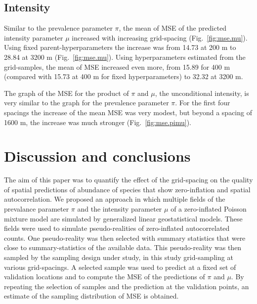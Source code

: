 \documentclass[review]{elsarticle}
\begin{document}
\subsection{Intensity}
Similar to the prevalence parameter $\pi$, the  mean of MSE of the predicted intensity parameter $\mu$ increased with increasing grid-spacing (Fig.~\ref{fig:mse.mu}). Using fixed parent-hyperparameters the increase was from 14.73 at 200 m to 28.84 at 3200 m (Fig.~\ref{fig:mse.mu}). Using hyperparameters estimated from the grid-samples, the mean of MSE increased even more, from 15.89 for 400 m (compared with 15.73 at 400 m for fixed hyperparameters) to 32.32 at 3200 m.  

The  graph of the MSE for the product of $\pi$ and $\mu$, the unconditional intensity, is very similar to the graph for the prevalence parameter $\pi$. For the first four spacings the increase of the mean MSE was very modest, but beyond a spacing of 1600 m, the increase was much stronger (Fig.~\ref{fig:mse.pimu}).  

\section{Discussion and conclusions}\label{sec:discussion}
The aim of this paper was to quantify the effect of the grid-spacing on the quality of spatial predictions of abundance of species that show zero-inflation and spatial autocorrelation. We proposed an approach in which multiple fields of the prevalance parameter $\pi$ and the intensity parameter $\mu$ of a zero-inflated Poisson mixture model are simulated by generalized linear geostatistical models. These fields were used to simulate pseudo-realities of zero-inflated autocorrelated counts. One pseudo-reality was then selected with summary statistics that were close to summary-statistics of the available data. This pseudo-reality was then sampled by the sampling design under study, in this study grid-sampling at various grid-spacings. A selected sample was used to predict at a fixed set of validation locations and to compute the MSE of the predictions of $\pi$ and $\mu$. By repeating the selection of samples and the prediction at the validation points, an estimate of the sampling distribution of MSE is obtained.
\end{document}
